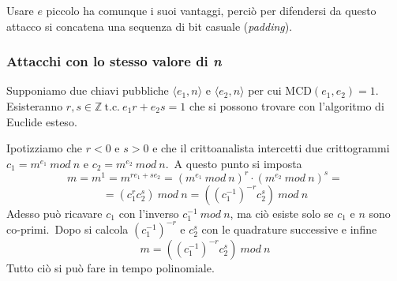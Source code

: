 Usare $e$ piccolo ha comunque i suoi vantaggi, perciò per difendersi da questo attacco si concatena una sequenza di bit casuale (\textit{padding}).\

\subsubsection{Attacchi con lo stesso valore di \textit{n}}

Supponiamo due chiavi pubbliche $\langle e_1 , n\rangle$ e $\langle e_2 , n\rangle$ per cui $\mathrm{MCD}(e_1, e_2) = 1$.
Esisteranno $r, s \in \mathbb{Z}\ \mathrm{t.c.}\ e_1 r + e_2 s = 1$ che si possono trovare con l'algoritmo di Euclide esteso.\

Ipotizziamo che $r < 0$ e $s > 0$ e che il crittoanalista intercetti due crittogrammi $c_1 = m^{e_1}\ \mathit{mod}\ n$ e $c_2 = m^{e_2}\ \mathit{mod}\ n$.\
A questo punto si imposta
\[m = m^1 = m^{re_1+se_2} = (m^{e_1}\ \mathit{mod}\ n)^r \cdot (m^{e_2}\ \mathit{mod}\ n)^s =\]
\[ = \left(c_1^r c_2^s\right)\ \mathit{mod}\ n  = \left(\left(c_1^{-1}\right)^{-r} c_2^s\right)\ \mathit{mod}\ n\]
Adesso può ricavare $c_1$ con l'inverso $c_1^{-1}\ \mathit{mod}\ n$, ma ciò esiste solo se $c_1$ e $n$ sono co-primi.\
Dopo si calcola $(c_1^{-1})^{-r}$ e $c_2^s$ con le quadrature successive e infine
\[m=\left(\left(c_1^{-1}\right)^{-r} c_2^s\right)\ \mathit{mod}\ n\]
Tutto ciò si può fare in tempo polinomiale.\
